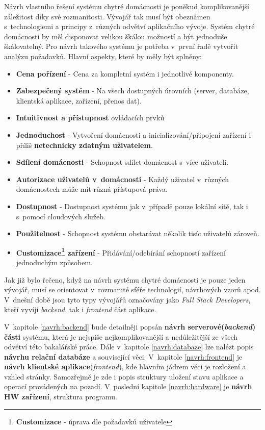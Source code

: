 Návrh vlastního řešení systému chytré domácnosti je poněkud komplikovanější záležitost díky své rozmanitosti.
Vývojář tak musí být obeznámen s~technologiemi a principy z~různých odvětví aplikačního vývoje.
Systém chytré domácnosti by měl disponovat velikou škálou možností a být jednoduše škálovatelný.
Pro návrh takového systému je potřeba v~první řadě vytvořit analýzu požadavků.
\newline
\newline
Hlavní aspekty, které by měly být splněny:
\begin{itemize}
  \item \textbf{Cena pořízení} - Cena za kompletní systém i jednotlivé komponenty.
  \item \textbf{Zabezpečený systém} - Na všech dostupných úrovních (server, databáze, klientská aplikace, zařízení, přenos dat).
  \item \textbf{Intuitivnost a přístupnost} ovládacích prvků
  \item \textbf{Jednoduchost} - Vytvoření domácnosti a inicializování/připojení zařízení i příliš \textbf{netechnicky zdatným uživatelem}.
  \item \textbf{Sdílení domácnosti} - Schopnost sdílet domácnost s~více uživateli.
  \item \textbf{Autorizace uživatelů v~domácnosti} - Každý uživatel v~různých domácnostech může mít různá přístupová práva.
  \item \textbf{Dostupnost} - Dostupnost systému jak v~případě pouze lokální síťě, tak i s~pomocí cloudových služeb.
  \item \textbf{Použitelnost} - Schopnost systému obstarávat několik tisíc uživatelů zároveň.
  \item \textbf{Customizace\footnote{\textbf{Customizace} - úprava dle požadavků uživatele} zařízení} - Přidávání/odebírání schopností zařízení jednoduchým způsobem.
\end{itemize}
Jak již bylo řečeno, když na návrh systému chytré domácnosti je pouze jeden vývojář, musí se orientovat v~rozmanité sféře technologií, návrhových vzorů apod.
V~dnešní době jsou tyto typy vývojářů označovány jako \emph{Full Stack Developers}, kteří vyvíjí \emph{backend}, tak i \emph{frontend} část aplikace.

V~kapitole \ref{navrh:backend} bude detailněji popsán \textbf{návrh serverové(\emph{backend}) části} systému, která je nejspíše nejkomplikovanější a nedůležitější ze všech odvětví této bakalářské práce.
Dále v~kapitole \ref{navrh:databaze} lze nalézt popis \textbf{návrhu relační databáze} a související věci.
V~kapitole \ref{navrh:frontend} je \textbf{návrh klientské aplikace}(\emph{frontend}), kde hlavním jádrem věci je rozložení a vzhled stránky.
Samozřejmě je zde i popis struktury uložení stavu aplikace a operací provádených na pozadí.
V~poslední kapitole \ref{navrh:hardware} je \textbf{návrh HW zařízení}, struktura programu.
\newpage

